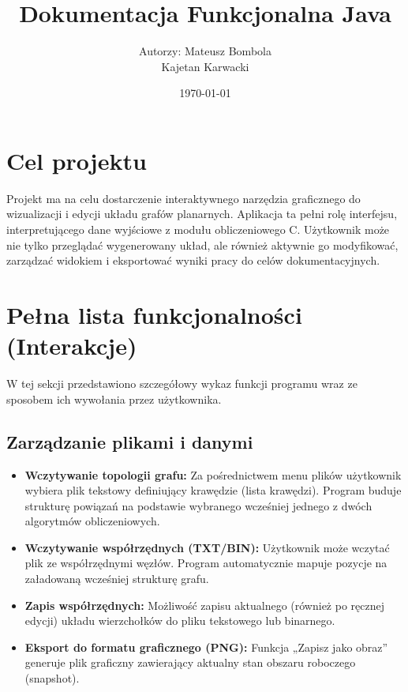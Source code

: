 \documentclass[12pt, a4paper]{article}
\title{\vspace*{3cm} \textbf{Dokumentacja Funkcjonalna Java}}
\author{Autorzy: Mateusz Bombola \\ Kajetan Karwacki}
\date{\today}
\begin{document}
\maketitle
\thispagestyle{empty}

\newpage
\tableofcontents
\newpage

\section{Cel projektu}
Projekt ma na celu dostarczenie interaktywnego narzędzia graficznego do wizualizacji i edycji układu grafów planarnych. Aplikacja ta pełni rolę interfejsu, interpretującego dane wyjściowe z modułu obliczeniowego C. Użytkownik może nie tylko przeglądać wygenerowany układ, ale również aktywnie go modyfikować, zarządzać widokiem i eksportować wyniki pracy do celów dokumentacyjnych.

\section{Pełna lista funkcjonalności (Interakcje)}
W tej sekcji przedstawiono szczegółowy wykaz funkcji programu wraz ze sposobem ich wywołania przez użytkownika.

\subsection{Zarządzanie plikami i danymi}
\begin{itemize}[label=$\square$]
    \item \textbf{Wczytywanie topologii grafu:} Za pośrednictwem menu plików użytkownik wybiera plik tekstowy definiujący krawędzie (lista krawędzi). Program buduje strukturę powiązań na podstawie wybranego wcześniej jednego z dwóch algorytmów obliczeniowych.
    \item \textbf{Wczytywanie współrzędnych (TXT/BIN):} Użytkownik może wczytać plik ze współrzędnymi węzłów. Program automatycznie mapuje pozycje na załadowaną wcześniej strukturę grafu.
    \item \textbf{Zapis współrzędnych:} Możliwość zapisu aktualnego (również po ręcznej edycji) układu wierzchołków do pliku tekstowego lub binarnego.
    \item \textbf{Eksport do formatu graficznego (PNG):} Funkcja „Zapisz jako obraz” generuje plik graficzny zawierający aktualny stan obszaru roboczego (snapshot).
\end{itemize}
\end{document}
